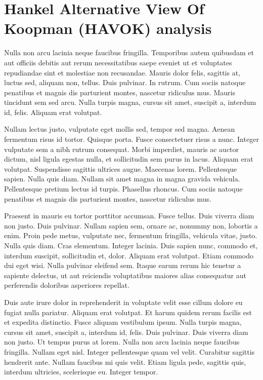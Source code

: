 \chapter{Hankel Alternative View Of Koopman (HAVOK) analysis}
Nulla non arcu lacinia neque faucibus fringilla. Temporibus autem quibusdam et aut officiis debitis aut rerum necessitatibus saepe eveniet ut et voluptates repudiandae sint et molestiae non recusandae. Mauris dolor felis, sagittis at, luctus sed, aliquam non, tellus. Duis pulvinar. In rutrum. Cum sociis natoque penatibus et magnis dis parturient montes, nascetur ridiculus mus. Mauris tincidunt sem sed arcu. Nulla turpis magna, cursus sit amet, suscipit a, interdum id, felis. Aliquam erat volutpat.

Nullam lectus justo, vulputate eget mollis sed, tempor sed magna. Aenean fermentum risus id tortor. Quisque porta. Fusce consectetuer risus a nunc. Integer vulputate sem a nibh rutrum consequat. Morbi imperdiet, mauris ac auctor dictum, nisl ligula egestas nulla, et sollicitudin sem purus in lacus. Aliquam erat volutpat. Suspendisse sagittis ultrices augue. Maecenas lorem. Pellentesque sapien. Nulla quis diam. Nullam sit amet magna in magna gravida vehicula. Pellentesque pretium lectus id turpis. Phasellus rhoncus. Cum sociis natoque penatibus et magnis dis parturient montes, nascetur ridiculus mus.

Praesent in mauris eu tortor porttitor accumsan. Fusce tellus. Duis viverra diam non justo. Duis pulvinar. Nullam sapien sem, ornare ac, nonummy non, lobortis a enim. Proin pede metus, vulputate nec, fermentum fringilla, vehicula vitae, justo. Nulla quis diam. Cras elementum. Integer lacinia. Duis sapien nunc, commodo et, interdum suscipit, sollicitudin et, dolor. Aliquam erat volutpat. Etiam commodo dui eget wisi. Nulla pulvinar eleifend sem. Itaque earum rerum hic tenetur a sapiente delectus, ut aut reiciendis voluptatibus maiores alias consequatur aut perferendis doloribus asperiores repellat.

Duis aute irure dolor in reprehenderit in voluptate velit esse cillum dolore eu fugiat nulla pariatur. Aliquam erat volutpat. Et harum quidem rerum facilis est et expedita distinctio. Fusce aliquam vestibulum ipsum. Nulla turpis magna, cursus sit amet, suscipit a, interdum id, felis. Duis pulvinar. Duis viverra diam non justo. Ut tempus purus at lorem. Nulla non arcu lacinia neque faucibus fringilla. Nullam eget nisl. Integer pellentesque quam vel velit. Curabitur sagittis hendrerit ante. Nullam faucibus mi quis velit. Etiam ligula pede, sagittis quis, interdum ultricies, scelerisque eu. Integer tempor.

